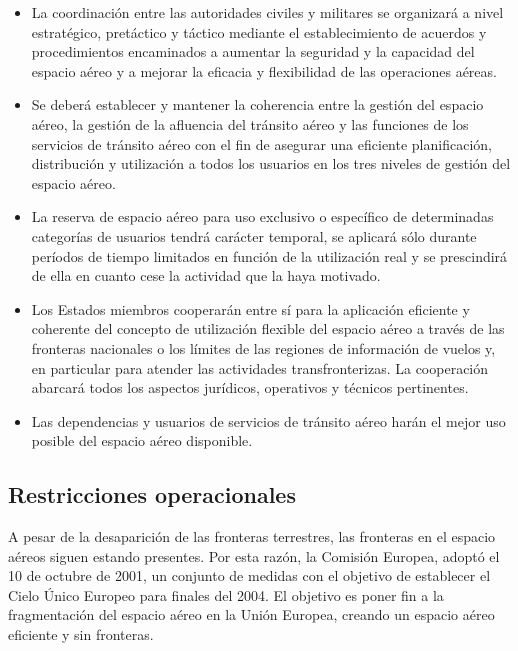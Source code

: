 \begin{itemize}
    \item La coordinación entre las autoridades civiles y militares se organizará a nivel estratégico, pretáctico y táctico mediante el establecimiento de acuerdos y procedimientos encaminados a aumentar la seguridad y la capacidad del espacio aéreo y a mejorar la eficacia y flexibilidad de las operaciones aéreas.
    
    \item Se deberá establecer y mantener la coherencia entre la gestión del espacio aéreo, la gestión de la afluencia del tránsito aéreo y las funciones de los servicios de tránsito aéreo con el fin de asegurar una eficiente planificación, distribución y utilización a todos los usuarios en los tres niveles de gestión del espacio aéreo.
    
    \item La reserva de espacio aéreo para uso exclusivo o específico de determinadas categorías de usuarios tendrá carácter temporal, se aplicará sólo durante períodos de tiempo limitados en función de la utilización real y se prescindirá de ella en cuanto cese la actividad que la haya motivado.
    
    \item Los Estados miembros cooperarán entre sí para la aplicación eficiente y coherente del concepto de utilización flexible del espacio aéreo a través de las fronteras nacionales o los límites de las regiones de información de vuelos y, en particular para atender las actividades transfronterizas. La cooperación abarcará todos los aspectos jurídicos, operativos y técnicos pertinentes.
    
    \item Las dependencias y usuarios de servicios de tránsito aéreo harán el mejor uso posible del espacio aéreo disponible.
\end{itemize}

\subsection{Restricciones operacionales}

A pesar de la desaparición de las fronteras terrestres, las fronteras en el espacio aéreos siguen estando presentes. Por esta razón, la Comisión Europea, adoptó el 10 de octubre de 2001, un conjunto de medidas con el objetivo de establecer el Cielo Único Europeo para finales del 2004. El objetivo es poner fin a la fragmentación del espacio aéreo en la Unión Europea, creando un espacio aéreo eficiente y sin fronteras.  

